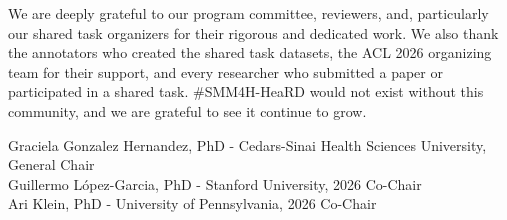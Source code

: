 \par\vspace{1em}
We are deeply grateful to our program committee, reviewers, and, particularly our shared task organizers for their rigorous and dedicated work. We also thank the annotators who created the shared task datasets, the ACL 2026 organizing team for their support, and every researcher who submitted a paper or participated in a shared task. \#SMM4H-HeaRD would not exist without this community, and we are grateful to see it continue to grow.

\par\vspace{2em}
\begin{flushleft}
Graciela Gonzalez Hernandez, PhD - Cedars-Sinai Health Sciences University, General Chair\\
Guillermo López-Garcia, PhD - Stanford University, 2026 Co-Chair\\
Ari Klein, PhD - University of Pennsylvania, 2026 Co-Chair
\end{flushleft}

